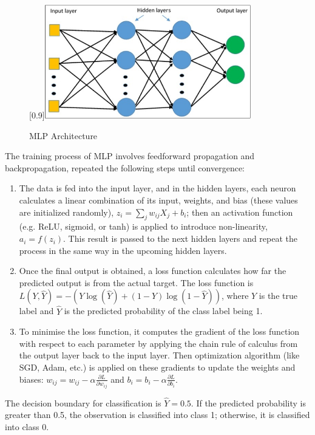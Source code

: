 \documentclass[a4paper,11pt]{report}
\begin{document}
\begin{figure}[H]
\begin{center}
\scalebox{1}[0.9]{\includegraphics[width=0.8\textwidth]{images/MLP_method.png}}
\caption{MLP Architecture}
\label{fig:mlp_architecture}
\end{center}
\end{figure}
The training process of MLP \citep{485891} involves feedforward propagation and backpropagation, repeated the following steps until convergence: 
\begin{enumerate}
    \item The data is fed into the input layer, and in the hidden layers, each neuron calculates a linear combination of its input, weights, and bias (these values are initialized randomly), $z_i=\sum_j w_{i j} X_j+b_i$; then an activation function (e.g. ReLU, sigmoid, or tanh) is applied to introduce non-linearity, $a_i=f\left(z_i\right)$. This result is passed to the next hidden layers and repeat the process in the same way in the upcoming hidden layers.
    \item  Once the final output is obtained, a loss function calculates how far the predicted output is from the actual target. The loss function is $L(Y, \hat{Y}) = - \left( Y \log(\hat{Y}) + (1 - Y) \log(1 - \hat{Y}) \right)$, where $Y$ is the true label and $\hat{Y}$ is the predicted probability of the class label being 1.
    \item To minimise the loss function, it computes the gradient of the loss function with respect to each parameter by applying the chain rule of calculus from the output layer back to the input layer. Then optimization algorithm (like SGD, Adam, etc.)  is applied on these gradients to update the weights and biases: $w_{ij} = w_{ij} - \alpha \frac{\partial L}{\partial w_{ij}}$ and $b_{i} = b_{i} - \alpha \frac{\partial L}{\partial b_{i}}$.
\end{enumerate}

The decision boundary for classification is $\hat{Y}=0.5$. If the predicted probability is greater than 0.5, the observation is classified into class 1; otherwise, it is classified into class 0.
\end{document}
